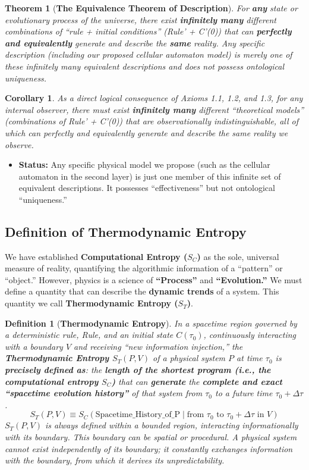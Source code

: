 \documentclass[11pt, a4paper]{article}
\newtheorem{theorem}{Theorem}[section]
\newtheorem{definition}{Definition}[section]
\newtheorem{corollary}{Corollary}[section]
\begin{document}
\begin{theorem}[\textbf{The Equivalence Theorem of Description}]
For \textbf{any} state or evolutionary process of the universe, there exist \textbf{infinitely many} different combinations of ``rule + initial conditions'' (Rule' + C'(0)) that can \textbf{perfectly and equivalently} generate and describe the \textbf{same} reality. Any specific description (including our proposed cellular automaton model) is merely one of these infinitely many equivalent descriptions and does not possess ontological uniqueness.
\end{theorem}
\begin{corollary}
As a direct logical consequence of Axioms 1.1, 1.2, and 1.3, for any internal observer, there must exist \textbf{infinitely many} different ``theoretical models'' (combinations of Rule' + C'(0)) that are observationally indistinguishable, all of which can perfectly and equivalently generate and describe the same reality we observe.
\end{corollary}
\begin{itemize}
    \item \textbf{Status:} Any specific physical model we propose (such as the cellular automaton in the second layer) is just one member of this infinite set of equivalent descriptions. It possesses ``effectiveness'' but not ontological ``uniqueness.''
\end{itemize}

\subsection*{Definition of Thermodynamic Entropy}
We have established \textbf{Computational Entropy ($S_C$)} as the sole, universal measure of reality, quantifying the algorithmic information of a ``pattern'' or ``object.'' However, physics is a science of \textbf{``Process''} and \textbf{``Evolution.''} We must define a quantity that can describe the \textbf{dynamic trends} of a system. This quantity we call \textbf{Thermodynamic Entropy ($S_T$)}.

\begin{definition}[\textbf{Thermodynamic Entropy}]
In a spacetime region governed by a deterministic rule, Rule, and an initial state $C(\tau_0)$, continuously interacting with a boundary $V$ and receiving ``new information injection,'' the \textbf{Thermodynamic Entropy $S_T(P, V)$} of a physical system $P$ at time $\tau_0$ is \textbf{precisely defined as}: the \textbf{length of the shortest program (i.e., the computational entropy $S_C$)} that can \textbf{generate} the \textbf{complete and exact ``spacetime evolution history''} of that system from $\tau_0$ to a future time $\tau_0+\Delta\tau$.
\[
S_T(P, V) \equiv S_C( \text{Spacetime\_History\_of\_P} \mid \text{from } \tau_0 \text{ to } \tau_0+\Delta\tau \text{ in } V )
\]
$S_T(P, V)$ is always defined within a bounded region, interacting informationally with its boundary. This boundary can be spatial or procedural. A physical system cannot exist independently of its boundary; it constantly exchanges information with the boundary, from which it derives its unpredictability.
\end{definition}
\end{document}
